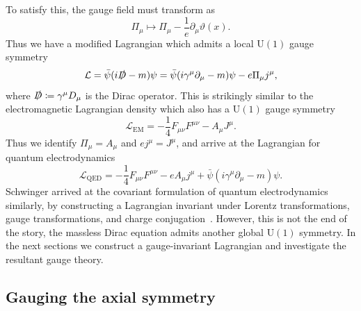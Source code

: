 \documentclass[11pt, a4paper]{article}
\begin{document}
To satisfy this, the gauge field must transform as
\begin{equation}
  \Pi_\mu \mapsto \Pi_\mu -\frac{1}{e}\partial_\mu\vartheta(x).
\end{equation}
Thus we have a modified Lagrangian which admits a local $\mathrm{U}(1)$ gauge symmetry
\begin{equation}
  \mathcal{L} = \bar{\psi}(i\slashed{D} - m)\psi
  = \bar{\psi}(i \gamma^\mu\partial_\mu - m)\psi -e\Pi_\mu j^\mu,
\end{equation}
where $\slashed{D} \coloneq \gamma^\mu D_\mu$ is the Dirac operator.
This is strikingly similar to the electromagnetic Lagrangian density which
also has a $\mathrm{U}(1)$ gauge symmetry
\begin{equation}
  \mathcal{L}_\mathrm{EM} = -\frac{1}{4}F_{\mu\nu}F^{\mu\nu} -A_\mu J^\mu.
\end{equation}
Thus we identify $\Pi_\mu = A_\mu$ and $ej^\mu = J^\mu$,
and arrive at the Lagrangian for quantum electrodynamics
\begin{equation}
  \mathcal{L}_\mathrm{QED} = -\frac{1}{4}F_{\mu\nu}F^{\mu\nu} -eA_\mu j^\mu
    + \bar{\psi}(i \gamma^\mu\partial_\mu - m)\psi.
\end{equation}
Schwinger arrived at the covariant formulation of quantum electrodynamics
similarly, by constructing a Lagrangian invariant under Lorentz transformations,
gauge transformations, and charge conjugation~\cite{Schwinger}. 
However, this is not the end of the story, the massless Dirac equation
admits another global $\mathrm{U}(1)$ symmetry. In the next sections 
we construct a gauge-invariant Lagrangian and investigate
the resultant gauge theory.

\subsection{Gauging the axial symmetry}
\end{document}
